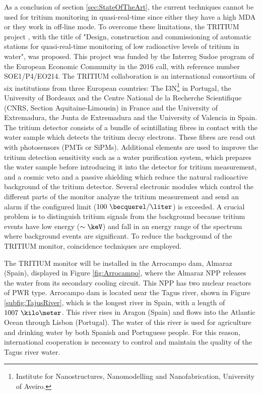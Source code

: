 As a conclusion of section \ref{sec:StateOfTheArt}, the current techniques cannot be used for tritium monitoring in quasi-real-time since either they have a high MDA or they work in off-line mode. To overcome these limitations, the TRITIUM project \cite{TRITIUM}, with the title of "Design, construction and commissioning of automatic stations for quasi-real-time monitoring of low radioactive levels of tritium in water", was proposed. This project was funded by the Interreg Sudoe program of the European Economic Community in the 2016 call, with reference number SOE1/P4/EO214. The TRITIUM collaboration is an international consortium of six institutions from three European countries: The I3N\footnote{Institute for Nanostructures, Nanomodelling and Nanofabrication, University of Aveiro.} in Portugal, the University of Bordeaux and the Centre National de la Recherche Scientifique (CNRS, Section Aquitaine-Limousin) in France and the University of Extremadura, the Junta de Extremadura and the University of Valencia in Spain. The tritium detector consists of a bundle of scintillating fibres in contact with the water sample which detects the tritium decay electrons. These fibres are read out with photosensors (PMTs or SiPMs). Additional elements are used to improve the tritium detection sensitivity such as a water purification system, which prepares the water sample before introducing it into the detector for tritium measurement, and a cosmic veto and a passive shielding which reduce the natural radioactive background of the tritium detector. Several electronic modules which control the different parts of the monitor analyze the tritium measurement and send an alarm if the configured limit ($100~\becquerel/\liter$) is exceeded. A crucial problem is to distinguish tritium signals from the background because tritium events have low energy ($\sim\keV$) and fall in an energy range of the spectrum where background events are significant. To reduce the background of the TRITIUM monitor, coincidence techniques are employed.


The TRITIUM monitor will be installed in the Arrocampo dam, Almaraz (Spain), displayed in Figure \ref{fig:Arrocampo}, where the Almaraz NPP releases the water from its secondary cooling circuit. This NPP has two nuclear reactors of PWR type. Arrocampo dam is located near the Tagus river, shown in Figure \ref{subfig:TajusRiver}, which is the longest river in Spain, with a length of $1007~\kilo\meter$. This river rises in Aragon (Spain) and flows into the Atlantic Ocean through Lisbon (Portugal). The water of this river is used for agriculture and drinking water by both Spanish and Portuguese people. For this reason, international cooperation is necessary to control and maintain the quality of the Tagus river water.

